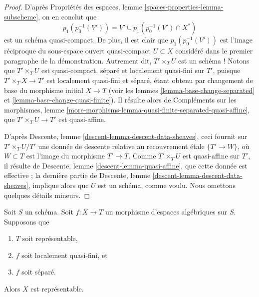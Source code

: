 \begin{proof}
\medskip\noindent
D'après
Propriétés des espaces, lemme \ref{spaces-properties-lemma-subscheme},
on en conclut que
$$
p_1(p_0^{-1}(V')) =
V' \cup p_1(p_0^{-1}(V') \cap X^*)
$$
est un schéma quasi-compact. De plus, il est clair que
$p_1(p_0^{-1}(V'))$ est l'image réciproque du
sous-espace ouvert quasi-compact $U \subset X$ considéré dans le
premier paragraphe de la démonstration. Autrement dit, $T' \times_T U$ est un schéma !
Notons que $T' \times_T U$ est quasi-compact,
séparé et localement quasi-fini sur $T'$, puisque
$T' \times_T X \to T'$ est localement quasi-fini et séparé,
étant obtenu par changement de base du morphisme initial $X \to T$ (voir les
lemmes \ref{lemma-base-change-separated} et
\ref{lemma-base-change-quasi-finite}).
Il résulte alors de
Compléments sur les morphismes,
lemme \ref{more-morphisms-lemma-quasi-finite-separated-quasi-affine},
que $T' \times_T U \to T'$ est quasi-affine.

\medskip\noindent
D'après
Descente, lemme \ref{descent-lemma-descent-data-sheaves},
ceci fournit sur $T' \times_T U / T'$ une donnée de descente
relative au recouvrement étale $\{T' \to W\}$, où $W \subset T$
est l'image du morphisme $T' \to T$.
Comme $T' \times_T U$ est quasi-affine sur $T'$, il résulte de
Descente, lemme \ref{descent-lemma-quasi-affine},
que cette donnée est effective ; la dernière partie de
Descente, lemme \ref{descent-lemma-descent-data-sheaves},
implique alors que $U$ est un schéma, comme voulu.
Nous omettons quelques détails mineurs.
\end{proof}

\begin{proposition}
\label{proposition-locally-quasi-finite-separated-over-scheme}
Soit $S$ un schéma.
Soit $f : X \to T$ un morphisme d'espaces algébriques sur $S$.
Supposons que
\begin{enumerate}
\item $T$ soit représentable,
\item $f$ soit localement quasi-fini, et
\item $f$ soit séparé.
\end{enumerate}
Alors $X$ est représentable.
\end{proposition}

